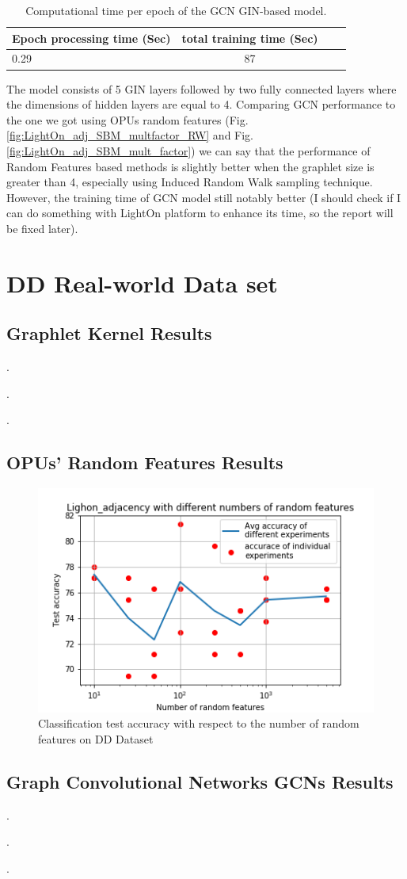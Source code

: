 \begin{table}
\begin{center}
\begin{tabular}{|l|c|c|c|}
\hline
{Epoch processing time (Sec)}  &  {total training time (Sec)} \\
\hline
0.29 & 87  \\
\hline
\end{tabular}
\end{center}
\caption{Computational time per epoch of the GCN GIN-based model.}
\label{table:OPU_multfactor_IRW_time}
\end{table}
The model consists of 5 GIN layers followed by two fully connected layers where the dimensions of hidden layers are equal to 4. Comparing GCN performance to the one we got using OPUs random features (Fig. \ref{fig:LightOn_adj_SBM_multfactor_RW} and Fig. \ref{fig:LightOn_adj_SBM_mult_factor}) we can say that the performance of Random Features based methods is slightly better when the graphlet size is greater than 4, especially using Induced Random Walk sampling technique. However, the training time of GCN model still notably better (I should check if I can do something with LightOn platform to enhance its time, so the report will be fixed later). 

\section{DD Real-world Data set}
\subsection{Graphlet Kernel Results}
.

.

.
\subsection{OPUs’ Random Features Results}
\begin{figure}[H]
\centering
\includegraphics[scale=0.7]{LatexDiss/Dissertation/figs/LightOn_adj_DD_varying_RF.png}

\caption[Classification test accuracy as a function of the number of random features]{Classification test accuracy with respect to the number of random features on DD Dataset}
\label{fig:LightON_DD_multfactor_RW}
\end{figure}

\subsection{Graph Convolutional Networks GCNs Results}
.

.

.